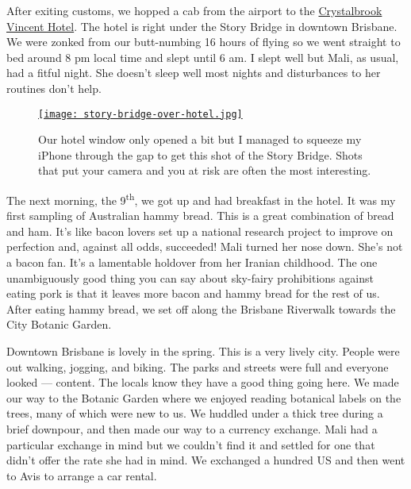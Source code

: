 After exiting customs, we hopped a cab from the airport to the
\href{https://www.crystalbrookcollection.com/vincent}{Crystalbrook
Vincent Hotel}. The hotel is right under the Story Bridge in downtown
Brisbane. We were zonked from our butt-numbing 16 hours of flying so we
went straight to bed around 8 pm local time and slept until 6 am. I
slept well but Mali, as usual, had a fitful night. She doesn't sleep
well most nights and disturbances to her routines don't help.

\captionsetup[figure]{labelformat=empty}
\begin{SCfigure}
\centering
\href{https://conceptcontrol.smugmug.com/Trips/Overseas/Australia-New-Zealand-2022/i-FwCCp3L/A}{\texttt{[image: story-bridge-over-hotel.jpg]}}
\caption[Story Bridge over our hotel]{Our hotel window only opened a bit but I managed to squeeze my
iPhone through the gap to get this shot of the Story Bridge. Shots that
put your camera and you at risk are often the most interesting.}
\label{fig:7548x0}
\end{SCfigure}
 

The next morning, the 9\textsuperscript{th}, we got up and had breakfast
in the hotel. It was my first sampling of Australian hammy bread. This
is a great combination of bread and ham. It's like bacon lovers set up a
national research project to improve on perfection and, against all
odds, succeeded! Mali turned her nose down. She's not a bacon fan. It's
a lamentable holdover from her Iranian childhood. The one unambiguously
good thing you can say about sky-fairy prohibitions against eating pork is
that it leaves more bacon and hammy bread for the rest of us. After
eating hammy bread, we set off along the Brisbane Riverwalk towards the
City Botanic Garden.

Downtown Brisbane is lovely in the spring. This is a very lively city.
People were out walking, jogging, and biking. The parks and streets were
full and everyone looked --- content. The locals know they have a good
thing going here. We made our way to the Botanic Garden where we enjoyed
reading botanical labels on the trees, many of which were new to us. We
huddled under a thick tree during a brief downpour, and then made our
way to a currency exchange. Mali had a particular exchange in mind but
we couldn't find it and settled for one that didn't offer the rate she
had in mind. We exchanged a hundred US and then went to Avis to arrange
a car rental.

